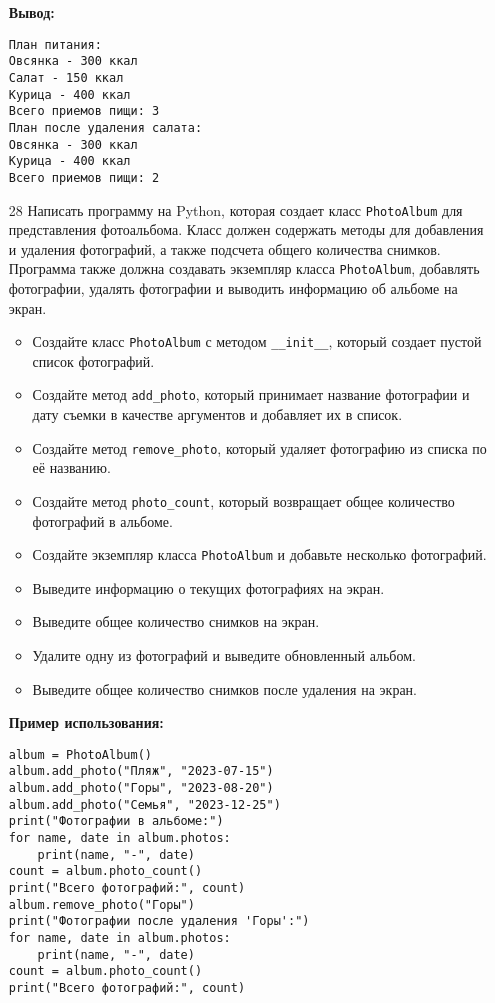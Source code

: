 \begin{enumerate}
\textbf{Вывод:}
\begin{verbatim}
План питания:
Овсянка - 300 ккал
Салат - 150 ккал
Курица - 400 ккал
Всего приемов пищи: 3
План после удаления салата:
Овсянка - 300 ккал
Курица - 400 ккал
Всего приемов пищи: 2
\end{verbatim}

\item[28] Написать программу на Python, которая создает класс \texttt{PhotoAlbum} для представления фотоальбома. Класс должен содержать методы для добавления и удаления фотографий, а также подсчета общего количества снимков. Программа также должна создавать экземпляр класса \texttt{PhotoAlbum}, добавлять фотографии, удалять фотографии и выводить информацию об альбоме на экран.

\begin{itemize}
    \item Создайте класс \texttt{PhotoAlbum} с методом \texttt{\_\_init\_\_}, который создает пустой список фотографий.
    \item Создайте метод \texttt{add\_photo}, который принимает название фотографии и дату съемки в качестве аргументов и добавляет их в список.
    \item Создайте метод \texttt{remove\_photo}, который удаляет фотографию из списка по её названию.
    \item Создайте метод \texttt{photo\_count}, который возвращает общее количество фотографий в альбоме.
    \item Создайте экземпляр класса \texttt{PhotoAlbum} и добавьте несколько фотографий.
    \item Выведите информацию о текущих фотографиях на экран.
    \item Выведите общее количество снимков на экран.
    \item Удалите одну из фотографий и выведите обновленный альбом.
    \item Выведите общее количество снимков после удаления на экран.
\end{itemize}

\textbf{Пример использования:}

\begin{verbatim}
album = PhotoAlbum()
album.add_photo("Пляж", "2023-07-15")
album.add_photo("Горы", "2023-08-20")
album.add_photo("Семья", "2023-12-25")
print("Фотографии в альбоме:")
for name, date in album.photos:
    print(name, "-", date)
count = album.photo_count()
print("Всего фотографий:", count)
album.remove_photo("Горы")
print("Фотографии после удаления 'Горы':")
for name, date in album.photos:
    print(name, "-", date)
count = album.photo_count()
print("Всего фотографий:", count)
\end{verbatim}


\end{enumerate}
